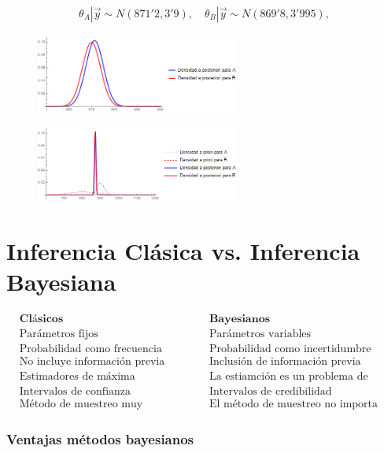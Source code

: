 \begin{ejemplo}
\begin{align*}
        \theta_A | \vec{y} \sim N(871'2, 3'9), \quad \theta_B | \vec{y} \sim N(869'8, 3'995),
    \end{align*}
\begin{figure}[H]
    \centering
    \includegraphics[width=0.6\textwidth]{imagenes4/aposte4.png}
\end{figure}
\begin{figure}[H]
    \centering
    \includegraphics[width=0.6\textwidth]{imagenes4/aposte5.png}
\end{figure}
\end{ejemplo}

\section{Inferencia Clásica vs. Inferencia Bayesiana}

\begin{align*}
    &\textbf{Clásicos} & & \textbf{Bayesianos} \\
    &\text{Parámetros fijos} & & \text{Parámetros variables} \\
    &\text{Probabilidad como frecuencia límite} & &\text{Probabilidad como incertidumbre} \\
    & \text{No incluye información previa} & & \text{Inclusión de información previa} \\
    &\text{Estimadores de máxima verosimilitud} & & \text{La estiamción es un problema de decisión} \\
    & \text{Intervalos de confianza} & & \text{Intervalos de credibilidad} \\
    & \text{Método de muestreo muy importante} & & \text{El método de muestreo no importa}
\end{align*}

\subsubsection{Ventajas métodos bayesianos}

